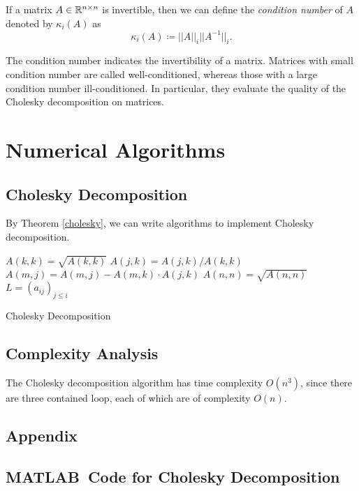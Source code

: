 \begin{definition}
If a matrix \(A\in\mathbb{R}^{n\times n}\) is invertible, then we can define the \emph{condition number} of $A$ denoted by \(\kappa_i(A)\) as
\begin{equation}
\kappa_i(A)\coloneqq||A||_i||A^{-1}||_i.
\end{equation}
\end{definition}
The condition number indicates the invertibility of a matrix.
Matrices with small condition number are called well-conditioned, whereas
those with a large condition number ill-conditioned.
In particular, they evaluate the quality of the Cholesky decomposition on matrices.
\cite{tam39}




\section{Numerical Algorithms}

\subsection{Cholesky Decomposition}
By Theorem \ref{cholesky}, we can write algorithms to implement Cholesky decomposition.
\begin{algorithm}[h]
		{
			\(A(k,k)=\sqrt{A(k,k)}\)\;
			{
				\(A(j,k)=A(j,k)/A(k,k)\)\;
			}
			{
				{
					\(A(m,j)=A(m,j)-A(m,k)\cdot A(j,k)\)\;
				}
			}
		}
		\(A(n,n)=\sqrt{A(n,n)}\)\;
		\(L=(a_{ij})_{j\leq i}\)\;
		\caption{Cholesky Decomposition\cite{tam37}}
\end{algorithm}

\subsection{Complexity Analysis}
The Cholesky decomposition algorithm has time complexity \(O\left(n^3\right)\), since there are three contained loop, each of which are of complexity \(O(n)\).


\newpage
\begin{appendices}
\renewcommand{\thesection}{\Alph{section}}
\section{Appendix}
\subsection{MATLAB\texttrademark\ Code for Cholesky Decomposition}

\end{appendices}